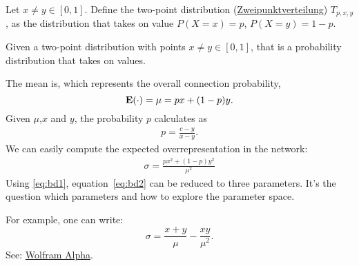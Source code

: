 
Let $x \neq y \in [0,1]$. Define the two-point distribution (\href{https://de.wikipedia.org/wiki/Zweipunktverteilung}{Zweipunktverteilung}) $T_{p,x,y}$, as the distribution that takes on value $P(X=x)=p$, $P(X=y) = 1-p$. 

Given a two-point distribution with points $x \neq y \in [0,1]$, that is a probability distribution that takes on values.

The mean is, which represents the overall connection probability,
\[
\operatorname{\mathbf{E}}(\cdot) = \mu = px + (1-p)y.
\]
Given $\mu$,$x$ and $y$, the probability $p$ calculates as
\begin{align}
  p = \frac{c-y}{x-y}. \label{eq:bd1}
\end{align}
We can easily compute the expected overrepresentation in the network:
\begin{align}
  \sigma = \frac{p x^2 + (1-p) y^2}{\mu^2} \label{eq:bd2}
\end{align}
Using \eqref{eq:bd1}, equation~\eqref{eq:bd2} can be reduced to three parameters. It's the question which parameters and how to explore the parameter space.

For example, one can write:
\[
\sigma = \frac{x+y}{\mu} - \frac{xy}{\mu^2}.
\]
See: \href{https://www.wolframalpha.com/input/?i=Simplify[%28%28%28c-y%29%2F%28x-y%29%29*x^2%2B%281-%28%28c-y%29%2F%28x-y%29%29%29*y^2%29%2Fc^2]}{Wolfram Alpha}.
